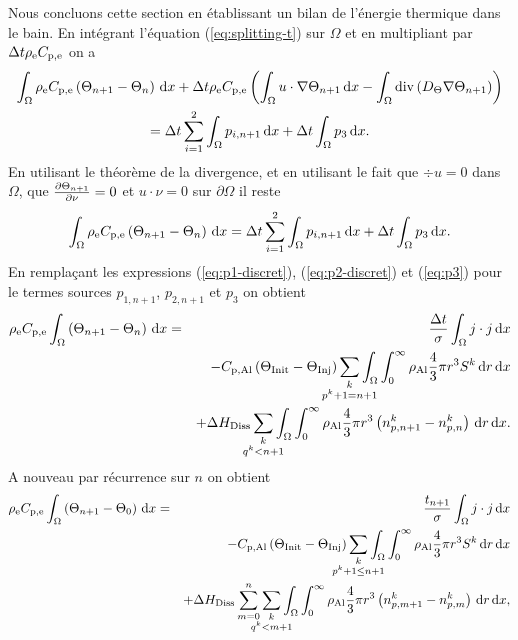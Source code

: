 Nous concluons cette section en établissant un bilan de l'énergie
thermique dans le bain. En intégrant l'équation (\ref{eq:splitting-t})
sur $\Omega$ et en multipliant par $\Delta t\rho_\mathrm{e}C_{\mathrm{p,e}}$
on a
\begin{multline}
\int_\Omega\rho_\mathrm{e}C_{\mathrm{p,e}}\left( \Theta_{n+1}
- \Theta_n \right)\,\mathrm dx
+\Delta t\rho_\mathrm{e}C_{\mathrm{p,e}}\left( \int_\Omega
  u\cdot\nabla\Theta_{n+1}\,\mathrm dx - \int_\Omega
  \mathrm{div}\left( D_\Theta\nabla\Theta_{n+1} \right) \right) \\
= \Delta t\sum_{i=1}^2\int_\Omega p_{i,n+1}\,\mathrm dx + \Delta t\int_\Omega p_3\,\mathrm dx.
\end{multline}
En utilisant le théorème de la divergence, et en utilisant le fait que
$\div u = 0$ dans $\Omega$, que $\frac{\partial
  \Theta_{n+1}}{\partial \nu} = 0$ et $u\cdot \nu = 0$ sur
$\partial \Omega$ il reste
\begin{equation}
  \int_\Omega\rho_\mathrm{e}C_{\mathrm{p,e}}\left( \Theta_{n+1} - \Theta_n \right)\,\mathrm dx = \Delta t\sum_{i=1}^2\int_\Omega p_{i,n+1}\,\mathrm dx + \Delta t\int_\Omega p_3\,\mathrm dx.
\end{equation}
En remplaçant les expressions (\ref{eq:p1-discret}), (\ref{eq:p2-discret}) et (\ref{eq:p3}) pour le termes sources $p_{1,n+1}$, $p_{2,n+1}$ et $p_3$ on obtient
\begin{eqnarray*}
  \electrolytedensity\electrolytehc\int_\Omega\parent{\temperature_{n+1} - \temperature_n}\intd{x} &=& \frac{\dt}{ \conductivity}\int_\Omega j\cdot j\intd{x}\\
  && - \aluminahc\parent{\tinit - \tinj}\sum_{\mathclap{\substack{k\\ p^k + 1 = n+1}}}\int_\Omega\int_0^\infty \aluminadensity \frac{4}{3}\pi r^3 S^k\intd{r}\intd{x}\\
  && + {\aluminadissolutionenthalpy}\sum_{\mathclap{\substack{k\\ q^k < n+1}}} \int_\Omega\int_0^\infty \aluminadensity \frac{4}{3}\pi r^3\parent{n_{p,n+1}^k-n_{p,n}^k}\intd{r}\intd{x}.
\end{eqnarray*}
A nouveau par récurrence sur $n$ on obtient
\begin{eqnarray}
  \electrolytedensity\electrolytehc\int_\Omega\parent{\temperature_{n+1} - \temperature_0}\intd{x} &=& \frac{t_{n+1}}{\conductivity}\int_\Omega j\cdot j\intd{x}\nonumber\\
  && - \aluminahc\parent{\tinit - \tinj}\sum_{\mathclap{\substack{k\\ p^k + 1 \leq n+1}}}\int_\Omega\int_0^\infty \aluminadensity \frac{4}{3}\pi r^3 S^k\intd{r}\intd{x}\nonumber\\
  && + {\aluminadissolutionenthalpy}\sum_{m =
    0}^{n}\sum_{\mathclap{\substack{k\\ q^k < m + 1}}}
  \int_\Omega\int_0^\infty \aluminadensity \frac{4}{3}\pi
  r^3\parent{n_{p,m+1}^k-n_{p,m}^k}\intd{r}\intd{x},\nonumber\\ \label{eq:energy-mass-balance}
\end{eqnarray}
